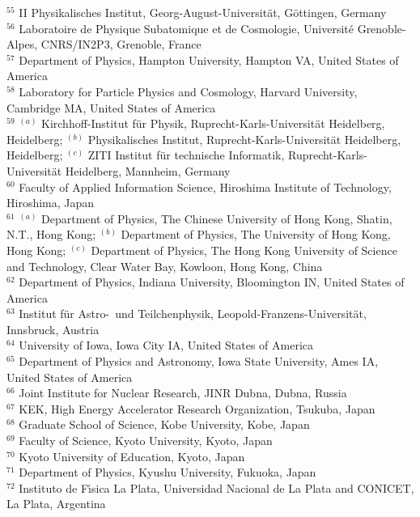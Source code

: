 \begin{flushleft}
$^{55}$ II Physikalisches Institut, Georg-August-Universit{\"a}t, G{\"o}ttingen, Germany\\
$^{56}$ Laboratoire de Physique Subatomique et de Cosmologie, Universit{\'e} Grenoble-Alpes, CNRS/IN2P3, Grenoble, France\\
$^{57}$ Department of Physics, Hampton University, Hampton VA, United States of America\\
$^{58}$ Laboratory for Particle Physics and Cosmology, Harvard University, Cambridge MA, United States of America\\
$^{59}$ $^{(a)}$ Kirchhoff-Institut f{\"u}r Physik, Ruprecht-Karls-Universit{\"a}t Heidelberg, Heidelberg; $^{(b)}$ Physikalisches Institut, Ruprecht-Karls-Universit{\"a}t Heidelberg, Heidelberg; $^{(c)}$ ZITI Institut f{\"u}r technische Informatik, Ruprecht-Karls-Universit{\"a}t Heidelberg, Mannheim, Germany\\
$^{60}$ Faculty of Applied Information Science, Hiroshima Institute of Technology, Hiroshima, Japan\\
$^{61}$ $^{(a)}$ Department of Physics, The Chinese University of Hong Kong, Shatin, N.T., Hong Kong; $^{(b)}$ Department of Physics, The University of Hong Kong, Hong Kong; $^{(c)}$ Department of Physics, The Hong Kong University of Science and Technology, Clear Water Bay, Kowloon, Hong Kong, China\\
$^{62}$ Department of Physics, Indiana University, Bloomington IN, United States of America\\
$^{63}$ Institut f{\"u}r Astro-{~}und Teilchenphysik, Leopold-Franzens-Universit{\"a}t, Innsbruck, Austria\\
$^{64}$ University of Iowa, Iowa City IA, United States of America\\
$^{65}$ Department of Physics and Astronomy, Iowa State University, Ames IA, United States of America\\
$^{66}$ Joint Institute for Nuclear Research, JINR Dubna, Dubna, Russia\\
$^{67}$ KEK, High Energy Accelerator Research Organization, Tsukuba, Japan\\
$^{68}$ Graduate School of Science, Kobe University, Kobe, Japan\\
$^{69}$ Faculty of Science, Kyoto University, Kyoto, Japan\\
$^{70}$ Kyoto University of Education, Kyoto, Japan\\
$^{71}$ Department of Physics, Kyushu University, Fukuoka, Japan\\
$^{72}$ Instituto de F{\'\i}sica La Plata, Universidad Nacional de La Plata and CONICET, La Plata, Argentina\\

\end{flushleft}
